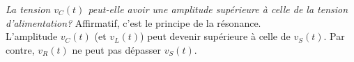 {%
\textit{La tension $v_C(t)$ peut-elle avoir une amplitude supérieure à celle de la tension d'alimentation?}
}
{%
Affirmatif, c'est le principe de la résonance.\\
L'amplitude $v_C(t)$ (et $v_L(t)$) peut devenir supérieure à celle de $v_S(t)$. Par contre, $v_R(t)$ ne peut pas dépasser $v_S(t)$.
}

\endinput
